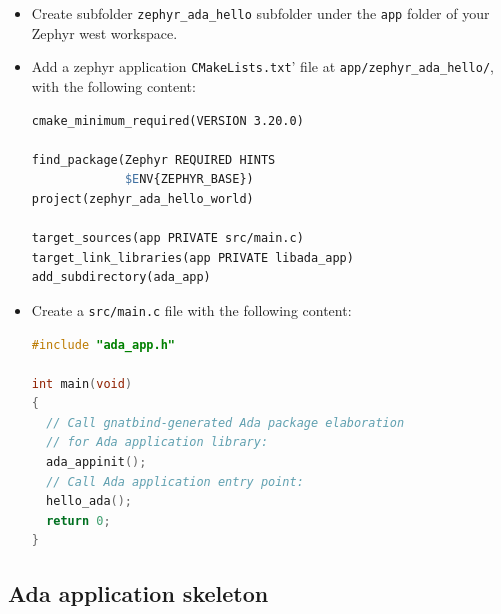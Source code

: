 \documentclass{AUJarticle}
\begin{document}
\begin{itemize}
\item Create subfolder \verb`zephyr_ada_hello` subfolder under the \verb`app` folder of
your Zephyr west workspace.

\item Add a zephyr application \verb`CMakeLists.txt`' file at \verb`app/zephyr_ada_hello/`,
with the following content:

\begin{lstlisting}[language=make, basicstyle=\ttfamily\scriptsize]
cmake_minimum_required(VERSION 3.20.0)

find_package(Zephyr REQUIRED HINTS
             $ENV{ZEPHYR_BASE})
project(zephyr_ada_hello_world)

target_sources(app PRIVATE src/main.c)
target_link_libraries(app PRIVATE libada_app)
add_subdirectory(ada_app)
\end{lstlisting}

\item Create a \verb`src/main.c` file with the following content:

\begin{lstlisting}[language=C, basicstyle=\ttfamily\scriptsize]
#include "ada_app.h"

int main(void)
{
  // Call gnatbind-generated Ada package elaboration
  // for Ada application library:
  ada_appinit();
  // Call Ada application entry point:
  hello_ada();
  return 0;
}
\end{lstlisting}
\end{itemize}

\subsection {Ada application skeleton}
\end{document}
